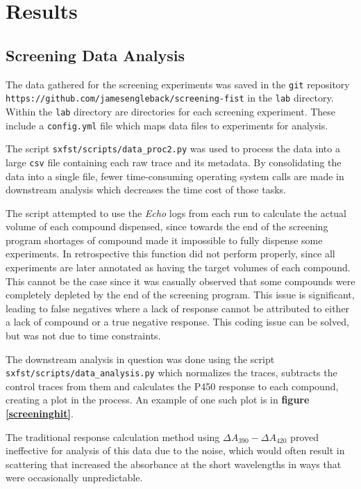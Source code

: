 \documentclass{article}
\begin{document}
%


\section{Results}
\subsection{Screening Data Analysis}

The data gathered for the screening experiments was saved in the \texttt{git} repository  \texttt{https://github.com/jamesengleback/screening-fist} in the \texttt{lab} directory.
Within the \texttt{lab} directory are directories for each screening experiment.
These include a \texttt{config.yml} file which maps data files to experiments for analysis.
\par
The script \texttt{sxfst/scripts/data\_proc2.py} was used to process the data into a large \texttt{csv} file containing each raw trace and its metadata.
By consolidating the data into a single file, fewer time-consuming operating system calls are made in downstream analysis which decreases the time cost of those tasks.

The script attempted to use the \textit{Echo} logs from each run to calculate the actual volume of each compound dispensed, since towards the end of the screening program shortages of compound made it impossible to fully dispense some experiments.
In retrospective this function did not perform properly, since all experiments are later annotated as having the target volumes of each compound.
This cannot be the case since it was casually observed that some compounds were completely depleted by the end of the screening program.
This issue is significant, leading to false negatives where a lack of response cannot be attributed to either a lack of compound or a true negative response.
This coding issue can be solved, but was not due to time constraints.

The downstream analysis in question was done using the script \texttt{sxfst/scripts/data\_analysis.py} which normalizes the traces, subtracts the control traces from them and calculates the P450 response to each compound, creating a plot in the process.
An example of one such plot is in \textbf{figure \ref{screeninghit}}.

The traditional response calculation method using $\Delta A_{390} - \Delta A_{420}$ proved ineffective for analysis of this data due to the noise, which would often result in scattering that increased the absorbance at the short wavelengths in ways that were occasionally unpredictable.
\end{document}
